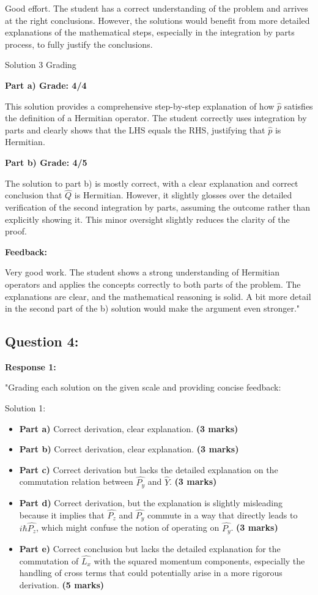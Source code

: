 \documentclass[a4paper,11pt]{article}
\begin{document}
Good effort. The student has a correct understanding of the problem and arrives at the right conclusions. However, the solutions would benefit from more detailed explanations of the mathematical steps, especially in the integration by parts process, to fully justify the conclusions.

Solution 3 Grading

\textbf{Part a) Grade: 4/4}

This solution provides a comprehensive step-by-step explanation of how \( \hat{p} \) satisfies the definition of a Hermitian operator. The student correctly uses integration by parts and clearly shows that the LHS equals the RHS, justifying that \( \hat{p} \) is Hermitian.

\textbf{Part b) Grade: 4/5}

The solution to part b) is mostly correct, with a clear explanation and correct conclusion that \( \hat{Q} \) is Hermitian. However, it slightly glosses over the detailed verification of the second integration by parts, assuming the outcome rather than explicitly showing it. This minor oversight slightly reduces the clarity of the proof.

\textbf{Feedback:}

Very good work. The student shows a strong understanding of Hermitian operators and applies the concepts correctly to both parts of the problem. The explanations are clear, and the mathematical reasoning is solid. A bit more detail in the second part of the b) solution would make the argument even stronger."

\subsection*{Question 4:}

\textbf{Response 1:}

"Grading each solution on the given scale and providing concise feedback:

Solution 1:

\begin{itemize}
    \item \textbf{Part a)} Correct derivation, clear explanation. \textbf{(3 marks)}
    \item \textbf{Part b)} Correct derivation, clear explanation. \textbf{(3 marks)}
    \item \textbf{Part c)} Correct derivation but lacks the detailed explanation on the commutation relation between \( \hat{P_{y}} \) and \( \hat{Y} \). \textbf{(3 marks)}
    \item \textbf{Part d)} Correct derivation, but the explanation is slightly misleading because it implies that \( \hat{P_{z}} \) and \( \hat{P_{y}} \) commute in a way that directly leads to \( i\hbar\hat{P_{z}} \), which might confuse the notion of operating on \( \hat{P_{y}} \). \textbf{(3 marks)}
    \item \textbf{Part e)} Correct conclusion but lacks the detailed explanation for the commutation of \( \hat{L_{x}} \) with the squared momentum components, especially the handling of cross terms that could potentially arise in a more rigorous derivation. \textbf{(5 marks)}
\end{itemize}
\end{document}
